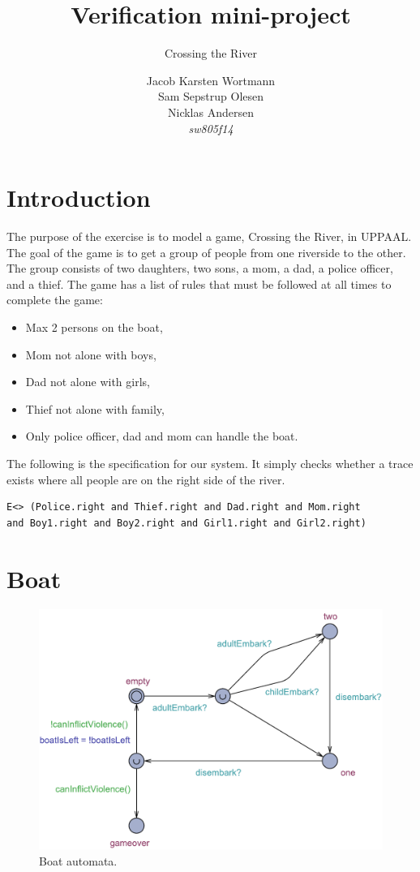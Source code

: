 \documentclass[a4paper,12pt]{scrartcl}
\title{Verification mini-project}
\subtitle{Crossing the River}
\author{Jacob Karsten Wortmann\\Sam Sepstrup Olesen\\Nicklas Andersen\\\textit{sw805f14}}
\begin{document}
\maketitle %

\section*{Introduction}
The purpose of the exercise is to model a game, Crossing the River, in UPPAAL. The goal of the game is to get a group of people from one riverside to the other. The group consists of two daughters, two sons, a mom, a dad, a police officer, and a thief.
The game has a list of rules that must be followed at all times to complete the game:

\begin{itemize}
\item Max 2 persons on the boat,
\item Mom not alone with boys,
\item Dad not alone with girls,
\item Thief not alone with family,
\item Only police officer, dad and mom can handle the boat.
\end{itemize}

The following is the specification for our system. It simply checks whether a trace exists where all people are on the right side of the river.
\begin{lstlisting}[keywords={and, E}]
E<> (Police.right and Thief.right and Dad.right and Mom.right
and Boy1.right and Boy2.right and Girl1.right and Girl2.right)
\end{lstlisting}

\section*{Boat}
\begin{figure}[h!]
\centering
\includegraphics[width=\linewidth]{Boat.pdf}
\caption{Boat automata.}
\label{fig:boat}
\end{figure}
\end{document}
